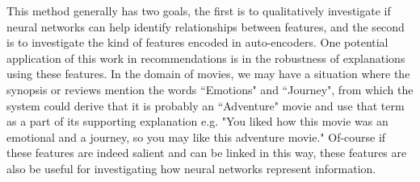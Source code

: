 This method generally has two goals, the first is to qualitatively investigate if neural networks can help identify relationships between features, and the second is  to investigate the kind of features encoded in auto-encoders. One potential application of this work in recommendations is in the robustness of explanations using these features. In the domain of movies, we may have a situation where the synopsis or reviews mention the words ``Emotions" and ``Journey", from which the system could derive that it is probably an ``Adventure" movie and use that term as a part of its supporting explanation e.g. "You liked how this movie was an emotional and a journey, so you may like this adventure movie." Of-course if these features are indeed salient and can be linked in this way, these features are also be useful for investigating how  neural networks represent information.



